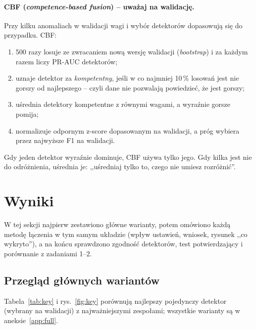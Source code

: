 \documentclass[11pt,a4paper]{article}
\begin{document}
\paragraph{CBF (\emph{competence-based fusion}) -- uważaj na walidację.}
Przy kilku anomaliach w walidacji wagi i wybór detektorów dopasowują się do
przypadku. CBF:
\begin{enumerate}
  \item 500 razy losuje ze zwracaniem nową wersję walidacji
  (\emph{bootstrap}) i za każdym razem liczy PR-AUC detektorów;
  \item uznaje detektor za \emph{kompetentny}, jeśli w co najmniej 10\,\%
  losowań jest nie gorszy od najlepszego -- czyli dane nie pozwalają
  powiedzieć, że jest gorszy;
  \item uśrednia detektory kompetentne z równymi wagami, a wyraźnie gorsze
  pomija;
  \item normalizuje odpornym z-score dopasowanym na walidacji, a próg wybiera
  przez najwyższe F1 na walidacji.
\end{enumerate}
Gdy jeden detektor wyraźnie dominuje, CBF używa tylko jego. Gdy kilka jest
nie do odróżnienia, uśrednia je: ,,uśredniaj tylko to, czego nie umiesz
rozróżnić''.

\FloatBarrier
\section{Wyniki}

W tej sekcji najpierw zestawiono główne warianty, potem omówiono każdą metodę
łączenia w tym samym układzie (wpływ ustawień, wniosek, rysunek ,,co
wykryto''), a na końcu sprawdzono zgodność detektorów, test potwierdzający
i porównanie z zadaniami 1--2.

\FloatBarrier
\subsection{Przegląd głównych wariantów}

Tabela~\ref{tab:key} i rys.~\ref{fig:key} porównują najlepszy pojedynczy
detektor (wybrany na walidacji) z najważniejszymi zespołami; wszystkie
warianty są w aneksie~\ref{app:full}.

\begin{table}[H]
  \centering\small
  \caption{PR-AUC głównych wariantów na każdym zbiorze danych, średnie PR-AUC
  i F1 oraz średni czas (część testowa; pogrubienie -- najlepszy wynik
  w kolumnie).}
  \label{tab:key}
\end{table}
\end{document}
